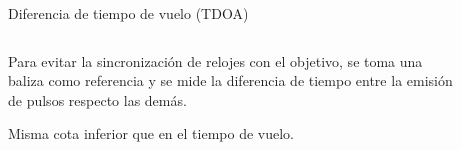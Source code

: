 \documentclass{beamer}
\begin{document}

    \begin{frame}{Diferencia de tiempo de vuelo (TDOA)}
      \begin{columns}
        \begin{column}{0.5\textwidth}
          Para evitar la sincronización de relojes con el objetivo, se toma una baliza como referencia y se mide la diferencia de tiempo entre la emisión de pulsos respecto las demás.

          \vspace{0.5cm}
          Misma cota inferior que en el tiempo de vuelo.
        \end{column}
        \begin{column}{0.5\textwidth}  
          \begin{figure}[H]
            \centering
            \def\svgwidth{\linewidth}
            
            \label{fig:TDOA}
        \end{figure}
        \end{column}
        \end{columns}
    \end{frame}
\end{document}
